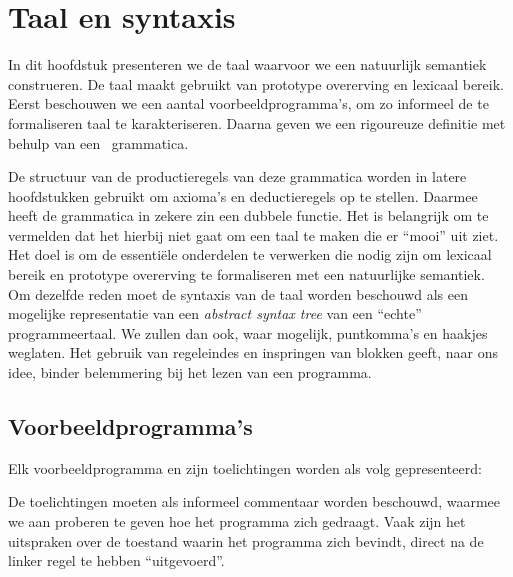 
\chapter{Taal en syntaxis}

In dit hoofdstuk presenteren we de taal waarvoor we een natuurlijk semantiek construeren. De taal maakt gebruikt van prototype overerving en lexicaal bereik. Eerst beschouwen we een aantal voorbeeldprogramma's, om zo informeel de te formaliseren taal te karakteriseren. Daarna geven we een rigoureuze definitie met behulp van een \BNF\ grammatica.

De structuur van de productieregels van deze grammatica worden in latere hoofdstukken gebruikt om axioma's en deductieregels op te stellen. Daarmee heeft de grammatica in zekere zin een dubbele functie.
Het is belangrijk om te vermelden dat het hierbij niet gaat om een taal te maken die er ``mooi'' uit ziet. Het doel is om de essentiële onderdelen te verwerken die nodig zijn om lexicaal bereik en prototype overerving te formaliseren met een natuurlijke semantiek. Om dezelfde reden moet de syntaxis van de taal worden beschouwd als een mogelijke representatie van een \emph{abstract syntax tree} van een ``echte'' programmeertaal. We zullen dan ook, waar mogelijk, puntkomma's en haakjes weglaten. Het gebruik van regeleindes en inspringen van blokken geeft, naar ons idee, binder belemmering bij het lezen van een programma.%

\section{Voorbeeldprogramma's}
\label{sec:voorbeelden}

Elk voorbeeldprogramma en zijn toelichtingen worden als volg gepresenteerd:

\codeFragmentCaption
{}

De toelichtingen moeten als informeel commentaar worden beschouwd, waarmee we aan proberen te geven hoe het programma zich gedraagt. Vaak zijn het uitspraken over de toestand waarin het programma zich bevindt, direct na de linker regel te hebben ``uitgevoerd''.

